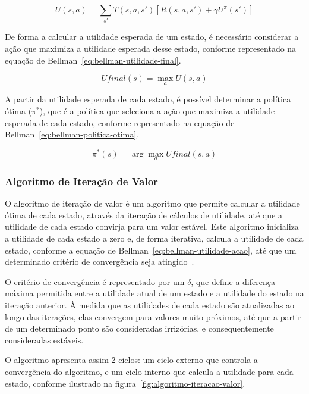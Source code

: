 \begin{equation}
    \label{eq:bellman-utilidade-acao}
    U(s, a) = \sum_{s'} T(s, a, s') [R(s, a, s') + \gamma U^\pi(s')]
\end{equation}

De forma a calcular a utilidade esperada de um estado, é necessário considerar a ação que maximiza a utilidade esperada desse estado, conforme representado na equação de Bellman~\ref{eq:bellman-utilidade-final}.

\begin{equation}
    \label{eq:bellman-utilidade-final}
    Ufinal(s) = \max_{a} U(s, a)
\end{equation}

A partir da utilidade esperada de cada estado, é possível determinar a política ótima ($\pi^*$), que é a política que seleciona a ação que maximiza a utilidade esperada de cada estado, conforme representado na equação de Bellman~\ref{eq:bellman-politica-otima}.

\begin{equation}
    \label{eq:bellman-politica-otima}
    \pi^*(s) = \arg\max_{a} Ufinal(s, a)
\end{equation}

\subsubsection{Algoritmo de Iteração de Valor}\label{subsubsec:algoritmo-iteracao-valor}

O algoritmo de iteração de valor é um algoritmo que permite calcular a utilidade ótima de cada estado, através da iteração de cálculos de utilidade, até que a utilidade de cada estado convirja para um valor estável.
Este algoritmo inicializa a utilidade de cada estado a zero e, de forma iterativa, calcula a utilidade de cada estado, conforme a equação de Bellman~\ref{eq:bellman-utilidade-acao}, até que um determinado critério de convergência seja atingido~\cite{isel:iasa:slides:processos-decisao-sequencial}.

O critério de convergência é representado por um $\delta$, que define a diferença máxima permitida entre a utilidade atual de um estado e a utilidade do estado na iteração anterior.
À medida que as utilidades de cada estado são atualizadas ao longo das iterações, elas convergem para valores muito próximos, até que a partir de um determinado ponto são consideradas irrizórias, e consequentemente consideradas estáveis.

O algoritmo apresenta assim 2 ciclos: um ciclo externo que controla a convergência do algoritmo, e um ciclo interno que calcula a utilidade para cada estado, conforme ilustrado na figura~\ref{fig:algoritmo-iteracao-valor}.

